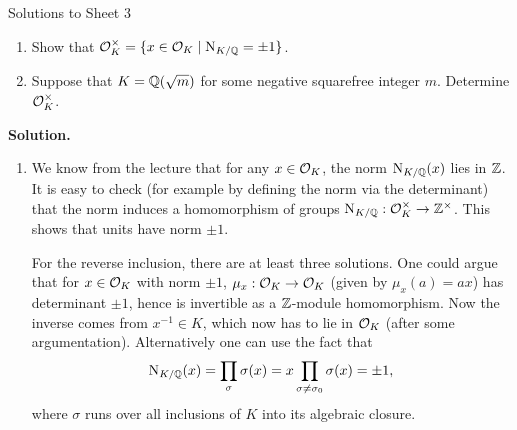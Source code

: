 \documentclass[a4paper,11pt]{article}
\begin{document}
\begin{center}
    \huge{Solutions to Sheet 3}
\end{center}

\begin{enumerate}
    \item Show that $\mathcal{O}_K^\times = \{x \in \mathcal{O}_K \mid \operatorname{N}_{K/\mathbb{Q}} = \pm 1\}$.
    \item Suppose that $K = \mathbb{Q}(\sqrt m)$ for some negative squarefree integer
        $m$. Determine $\mathcal{O}_K^\times$. 
\end{enumerate}

\textbf{Solution.}
\begin{enumerate}
    \item We know from the lecture that for any $x \in \mathcal{O}_K$, the norm
        $\operatorname{N}_{K/\mathbb{Q}}(x)$ lies in $\mathbb{Z}$. It is easy to check (for example by 
        defining the norm via the determinant) that the norm induces a
        homomorphism of groups $\operatorname{N}_{K/\mathbb{Q}}: \mathcal{O}_K^\times \to \mathbb{Z}^\times$.
        This shows that units have norm $\pm 1$. 

        For the reverse inclusion, there are at least three solutions. 
        One could argue that for $x \in \mathcal{O}_K$ with norm $\pm 1$, $\mu_x: \mathcal{O}_K
        \to \mathcal{O}_K$ (given by $\mu_x(a) = ax$) has determinant $\pm 1$, hence is
        invertible as a $\mathbb{Z}$-module homomorphism. Now the inverse comes from
        $x^{-1} \in K$, which now has to lie in $\mathcal{O}_K$ (after some
        argumentation). Alternatively one can use the fact that $$\operatorname{N}_{K/\mathbb{Q}}(x) =
        \prod_\sigma \sigma(x) = x \prod_{\sigma \neq \sigma_0} \sigma(x) = \pm
        1,$$ where $\sigma$ runs over all inclusions of $K$ into its algebraic
        closure. 


\end{enumerate}
\end{document}
